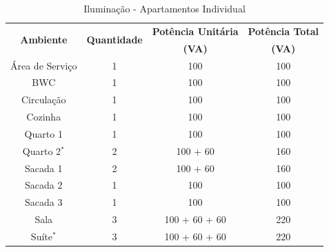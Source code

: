 \documentclass[12pt,openright,oneside,a4paper,brazil]{abntex2}
\begin{document}
\begin{table}[H]
\centering
\caption{Iluminação - Apartamentos Individual}

\renewcommand{\arraystretch}{1.1} %
\setlength{\tabcolsep}{12pt}      %

\begin{tabular}{cccc}
\toprule
\multirow{2}{*}{\textbf{Ambiente}} & \multirow{2}{*}{\textbf{Quantidade}} & \textbf{Potência Unitária} & \textbf{Potência Total} \\
                                   &                                      & \textbf{(VA)}              & \textbf{(VA)}           \\
\midrule
Área de Serviço                    & 1                                    & 100                        & 100                     \\
BWC                                & 1                                    & 100                        & 100                     \\
Circulação                         & 1                                    & 100                        & 100                     \\
Cozinha                            & 1                                    & 100                        & 100                     \\
Quarto 1                           & 1                                    & 100                        & 100                     \\
Quarto 2$^{*}$                           & 2                                    & 100 + 60                   & 160                     \\
Sacada 1                           & 2                                    & 100 + 60                   & 160                     \\
Sacada 2                           & 1                                    & 100                        & 100                     \\
Sacada 3                           & 1                                    & 100                        & 100                     \\
Sala                               & 3                                    & 100 + 60 + 60              & 220                     \\
Suíte$^{*}$                              & 3                                    & 100 + 60 + 60              & 220                     \\

\end{tabular}
\end{table}
\end{document}
